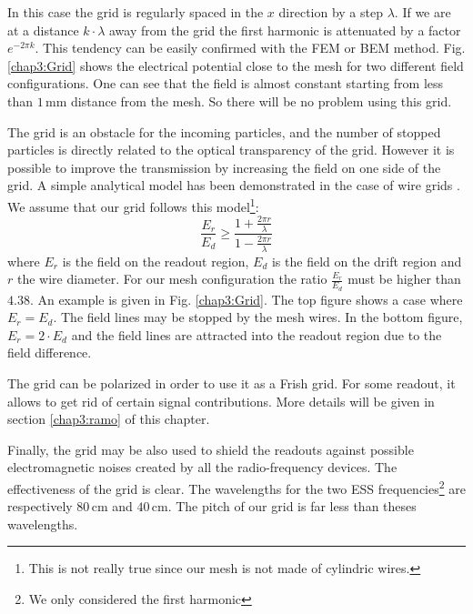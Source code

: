 \begin{refsection}
  In this case the grid is regularly spaced in the $x$ direction by a step $\lambda$. If we are at a distance $k \cdot \lambda$ away from the grid the first harmonic is attenuated by a factor $e^{-2\pi k}$. This tendency can be easily confirmed with the FEM or BEM method. Fig. \ref{chap3:Grid} shows the electrical potential close to the mesh for two different field configurations. One can see that the field is almost constant starting from less than $1\,\mathrm{mm}$ distance from the mesh. So there will be no problem using this grid.

  

  The grid is an obstacle for the incoming particles, and the number of stopped particles is directly related to the optical transparency of the grid. However it is possible to improve the transmission by increasing the field on one side of the grid. A simple analytical model has been demonstrated in the case of wire grids \cite{Bunemann1949}. We assume that our grid follows this model\footnote{This is not really true since our mesh is not made of cylindric wires.}:
  \begin{equation}
    \frac{E_{r}}{E_{d}} \geq \frac{1+\frac{2 \pi r}{\lambda}}{1-\frac{2 \pi r}{\lambda}}
  \end{equation}
  where $E_{r}$ is the field on the readout region, $E_{d}$ is the field on the drift region and $r$ the wire diameter. For our mesh configuration the ratio $\frac{E_{r}}{E_{d}}$ must be higher than $4.38$.
  An example is given in Fig. \ref{chap3:Grid}. The top figure shows a case where $E_{r}=E_{d}$. The field lines may be stopped by the mesh wires. In the bottom figure, $E_{r}=2 \cdot E_{d}$ and the field lines are attracted into the readout region due to the field difference.

  The grid can be polarized in order to use it as a Frish grid. For some readout, it allows to get rid of certain signal contributions. More details will be given in section \ref{chap3:ramo} of this chapter.

  Finally, the grid may be also used to shield the readouts against possible electromagnetic noises created by all the radio-frequency devices. The effectiveness of the grid is clear. The wavelengths for the two ESS frequencies\footnote{We only considered the first harmonic} are respectively $80\,\mathrm{cm}$ and $40\,\mathrm{cm}$. The pitch of our grid is far less than theses wavelengths.



\end{refsection}
